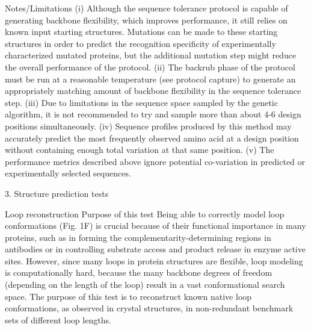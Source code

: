 Notes/Limitations
(i) Although the sequence tolerance protocol is capable of generating backbone flexibility, which improves performance, it still relies on known input starting structures. Mutations can be made to these starting structures in order to predict the recognition specificity of experimentally characterized mutated proteins, but the additional mutation step might reduce the overall performance of the protocol. (ii) The backrub phase of the protocol must be run at a reasonable temperature (see protocol capture) to generate an appropriately matching amount of backbone flexibility in the sequence tolerance step. (iii) Due to limitations in the sequence space sampled by the genetic algorithm, it is not recommended to try and sample more than about 4-6 design positions simultaneously. (iv) Sequence profiles produced by this method may accurately predict the most frequently observed amino acid at a design position without containing enough total variation at that same position. (v) The performance metrics described above ignore potential co-variation in predicted or experimentally selected sequences.

3. Structure prediction tests

Loop reconstruction
Purpose of this test
Being able to correctly model loop conformations (Fig. 1F) is crucial because of their functional importance in many proteins, such as in forming the complementarity-determining regions in antibodies or in controlling substrate access and product release in enzyme active sites. However, since many loops in protein structures are flexible, loop modeling is computationally hard, because the many backbone degrees of freedom (depending on the length of the loop) result in a vast conformational search space. The purpose of this test is to reconstruct known native loop conformations, as observed in crystal structures, in non-redundant benchmark sets of different loop lengths.


